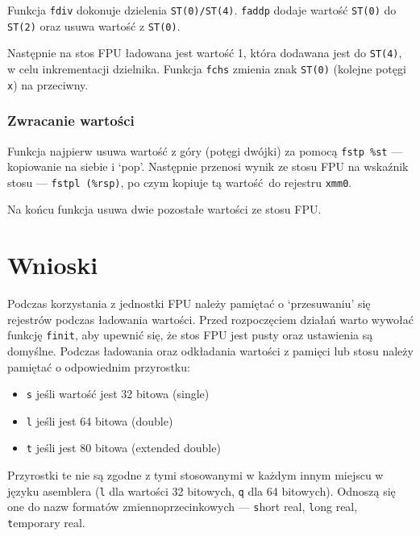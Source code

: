 \documentclass[polish, 11pt]{article}
\begin{document}
			Funkcja \verb|fdiv| dokonuje dzielenia \verb|ST(0)/ST(4)|.
			\verb|faddp| dodaje wartość \verb|ST(0)| do \verb|ST(2)| oraz usuwa wartość z \verb|ST(0)|.

			Następnie na stos FPU ładowana jest wartość 1, która dodawana jest do \verb|ST(4)|, w celu inkrementacji dzielnika.
			Funkcja \verb|fchs| zmienia znak \verb|ST(0)| (kolejne potęgi \verb|x|) na przeciwny.

			

		\subsubsection{Zwracanie wartości}
			Funkcja najpierw usuwa wartość z góry (potęgi dwójki) za pomocą \verb|fstp %st|
			--- kopiowanie na siebie i `pop'.
			Następnie przenosi wynik ze stosu FPU na wskaźnik stosu --- \verb|fstpl (%rsp)|,
			po czym kopiuje tą wartość do rejestru \verb|xmm0|.

			Na końcu funkcja usuwa dwie pozostałe wartości ze stosu FPU.\ 

			

\section{Wnioski}
	Podczas korzystania z jednostki FPU należy pamiętać o `przesuwaniu' się rejestrów podczas ładowania wartości.
	Przed rozpoczęciem działań warto wywołać funkcję \verb|finit|, aby upewnić się, że stos FPU jest pusty oraz ustawienia są domyślne.
	Podczas ładowania oraz odkładania wartości z pamięci lub stosu należy pamiętać o odpowiednim przyrostku:
	\begin{itemize}
		\item \verb|s| jeśli wartość jest 32 bitowa (single)
		\item \verb|l| jeśli jest 64 bitowa (double)
		\item \verb|t| jeśli jest 80 bitowa (extended double)
	\end{itemize}

	Przyrostki te nie są zgodne z tymi stosowanymi w każdym innym miejscu w języku asemblera
	(\verb|l| dla wartości 32 bitowych, \verb|q| dla 64 bitowych).
	Odnoszą się one do nazw formatów zmiennoprzecinkowych --- \verb|s|hort real, \verb|l|ong real, \verb|t|emporary real.
\end{document}
